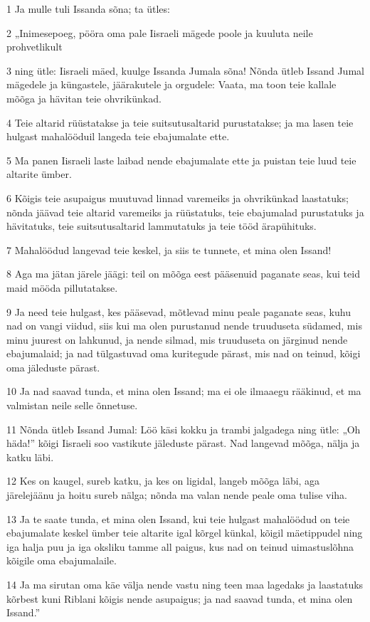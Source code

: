 \par 1 Ja mulle tuli Issanda sõna; ta ütles:
\par 2 „Inimesepoeg, pööra oma pale Iisraeli mägede poole ja kuuluta neile prohvetlikult
\par 3 ning ütle: Iisraeli mäed, kuulge Issanda Jumala sõna! Nõnda ütleb Issand Jumal mägedele ja küngastele, jäärakutele ja orgudele: Vaata, ma toon teie kallale mõõga ja hävitan teie ohvrikünkad.
\par 4 Teie altarid rüüstatakse ja teie suitsutusaltarid purustatakse; ja ma lasen teie hulgast mahalööduil langeda teie ebajumalate ette.
\par 5 Ma panen Iisraeli laste laibad nende ebajumalate ette ja puistan teie luud teie altarite ümber.
\par 6 Kõigis teie asupaigus muutuvad linnad varemeiks ja ohvrikünkad laastatuks; nõnda jäävad teie altarid varemeiks ja rüüstatuks, teie ebajumalad purustatuks ja hävitatuks, teie suitsutusaltarid lammutatuks ja teie tööd ärapühituks.
\par 7 Mahalöödud langevad teie keskel, ja siis te tunnete, et mina olen Issand!
\par 8 Aga ma jätan järele jäägi: teil on mõõga eest pääsenuid paganate seas, kui teid maid mööda pillutatakse.
\par 9 Ja need teie hulgast, kes pääsevad, mõtlevad minu peale paganate seas, kuhu nad on vangi viidud, siis kui ma olen purustanud nende truuduseta südamed, mis minu juurest on lahkunud, ja nende silmad, mis truuduseta on järginud nende ebajumalaid; ja nad tülgastuvad oma kuritegude pärast, mis nad on teinud, kõigi oma jäleduste pärast.
\par 10 Ja nad saavad tunda, et mina olen Issand; ma ei ole ilmaaegu rääkinud, et ma valmistan neile selle õnnetuse.
\par 11 Nõnda ütleb Issand Jumal: Löö käsi kokku ja trambi jalgadega ning ütle: „Oh häda!” kõigi Iisraeli soo vastikute jäleduste pärast. Nad langevad mõõga, nälja ja katku läbi.
\par 12 Kes on kaugel, sureb katku, ja kes on ligidal, langeb mõõga läbi, aga järelejäänu ja hoitu sureb nälga; nõnda ma valan nende peale oma tulise viha.
\par 13 Ja te saate tunda, et mina olen Issand, kui teie hulgast mahalöödud on teie ebajumalate keskel ümber teie altarite igal kõrgel künkal, kõigil mäetippudel ning iga halja puu ja iga oksliku tamme all paigus, kus nad on teinud uimastuslõhna kõigile oma ebajumalaile.
\par 14 Ja ma sirutan oma käe välja nende vastu ning teen maa lagedaks ja laastatuks kõrbest kuni Riblani kõigis nende asupaigus; ja nad saavad tunda, et mina olen Issand.”

